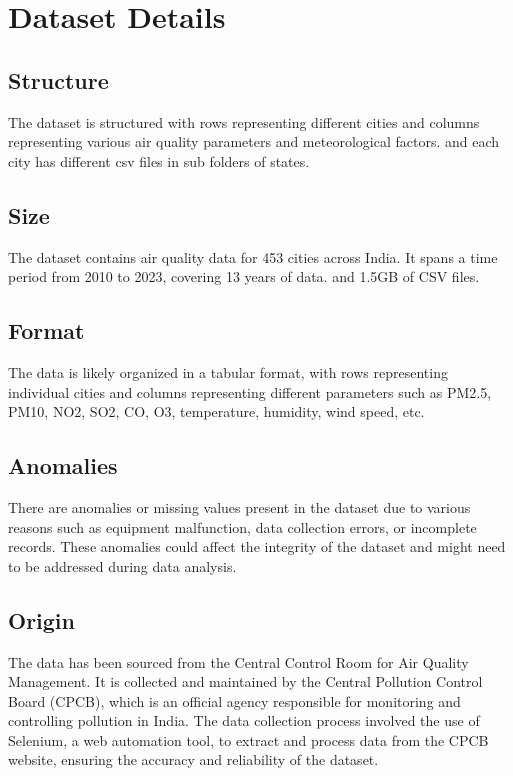 \section{Dataset Details}

\subsection{Structure}
The dataset is structured with rows representing different cities and columns representing various air quality parameters and meteorological factors. and each city has different csv files in sub folders of states. 

\subsection{Size}
The dataset contains air quality data for 453 cities across India. It spans a time period from 2010 to 2023, covering 13 years of data. and 1.5GB of CSV files.

\subsection{Format}
The data is likely organized in a tabular format, with rows representing individual cities and columns representing different parameters such as PM2.5, PM10, NO2, SO2, CO, O3, temperature, humidity, wind speed, etc\cite{CPCB:2023}.

\subsection{Anomalies}
There are anomalies or missing values present in the dataset due to various reasons such as equipment malfunction, data collection errors, or incomplete records. These anomalies could affect the integrity of the dataset and might need to be addressed during data analysis.

\subsection{Origin}
The data has been sourced from the Central Control Room for Air Quality Management. It is collected and maintained by the Central Pollution Control Board (CPCB), which is an official agency responsible for monitoring and controlling pollution in India. The data collection process involved the use of Selenium, a web automation tool, to extract and process data from the CPCB website, ensuring the accuracy and reliability of the dataset\cite{CPCB:2023}.
